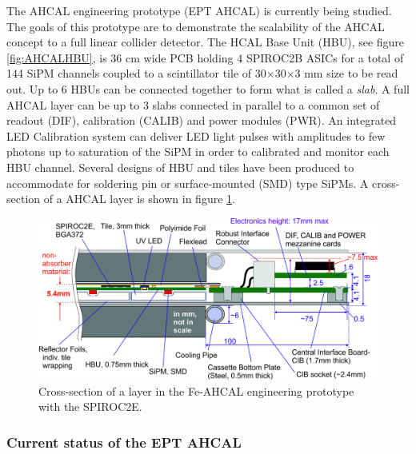 The AHCAL engineering prototype (EPT AHCAL) is currently being studied. The goals of this prototype are to demonstrate the scalability of the AHCAL concept to a full linear collider detector. The HCAL Base Unit (HBU), see figure \ref{fig:AHCALHBU}, is 36 cm wide PCB holding 4 SPIROC2B ASICs for a total of 144 SiPM channels coupled to a scintillator tile of 30$\times$30$\times$3 mm size to be read out. Up to 6 HBUs can be connected together to form what is called a \textit{slab}. A full AHCAL layer can be up to 3 slabs connected in parallel to a common set of readout (DIF), calibration (CALIB) and power modules (PWR). An integrated LED Calibration system can deliver LED light pulses with amplitudes to few photons up to saturation of the SiPM in order to calibrated and monitor each HBU channel. Several designs of HBU and tiles have been produced to accommodate for soldering pin or surface-mounted (SMD) type SiPMs. A cross-section of a AHCAL layer is shown in figure \ref{fig:SectionAHCAL}.

\begin{figure}[htbp!]
  \centering
  \includegraphics[width=0.8\linewidth]{chap3/fig/HCAL_cross_endface_vers0p4.jpg}
  \caption{Cross-section of a layer in the Fe-AHCAL engineering prototype with the SPIROC2E.} \label{fig:SectionAHCAL}
\end{figure}

\subsubsection{Current status of the EPT AHCAL}

